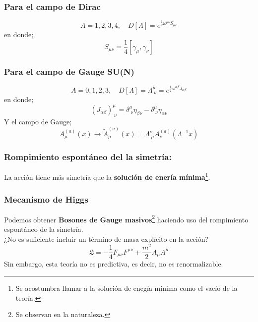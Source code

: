 \documentclass[../main.tex]{subfiles}
\begin{document}
   \subsubsection{Para el campo de Dirac}
   \begin{equation}
     A=1,2,3,4,\quad D[\Lambda] = e^{\frac{1}{2}\omega^{\mu\nu}S_{\mu\nu}}
    \end{equation}
    en donde;
    \begin{equation}
      S_{\mu\nu} = \frac{1}{4} \left[ \gamma_\mu,\gamma_\nu \right]
     \end{equation}
\subsubsection{Para el campo de Gauge SU(N)}
\begin{equation}
  A=0,1,2,3,\quad D[\Lambda] = \Lambda^{\mu}_{\;\nu} = e^{\frac{1}{2}\omega^{\alpha\beta}J_{\alpha \beta}}
 \end{equation}
 en donde;
 \begin{equation}
   \left( J_{\alpha \beta} \right)^\mu_{\;\nu} = \delta^\mu_{\;\nu}\eta_{ \beta \nu} - \delta^{\mu}_{\;\nu}\eta_{\alpha \nu}
  \end{equation}
  Y el campo de Gauge;
  \begin{equation}
    A^{(a)}_\mu(x) \rightarrow \tilde{A}_{\mu}^{(a)} (x) = \Lambda^{\nu}_{\;\mu}A^{(a)}_\nu(\Lambda^{-1}x)
   \end{equation}
\subsubsection{Rompimiento espontáneo del la simetría:}
La acción tiene más simetría que la \textbf{solución de enería mínima}\footnote{Se acostumbra llamar a la solución de enegía mínima como el vacío de la teoría.}.
\subsubsection{Mecanismo de Higgs}
Podemos obtener \textbf{Bosones de Gauge masivos}\footnote{Se observan en la naturaleza.} haciendo uso del rompimiento espontáneo de la simetría. \\
¿No es suficiente incluir un término de masa explícito en la acción? 
\begin{equation}
  \mathfrak{L} = -\frac{1}{4} F_{\mu\nu} F^{\mu\nu} + \frac{m^2}{2}A_{\mu} A^{\mu}
 \end{equation}
 Sin embargo, esta teoría no es predictiva, es decir, no es renormalizable. \\
\end{document}
